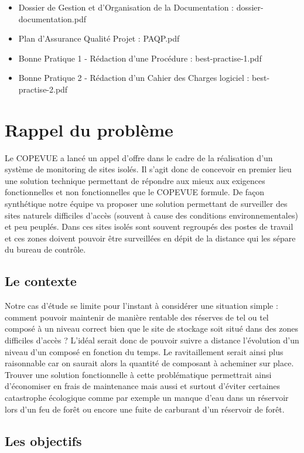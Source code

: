 \begin{itemize}
\item Dossier de Gestion et d'Organisation de la Documentation : dossier-documentation.pdf
\item Plan d'Assurance Qualité Projet : PAQP.pdf
\item Bonne Pratique 1 - Rédaction d'une Procédure : best-practise-1.pdf
\item Bonne Pratique 2 - Rédaction d'un Cahier des Charges logiciel : best-practise-2.pdf
\end{itemize}
    
\section{Rappel du problème}

Le COPEVUE a lancé un appel d'offre dans le cadre de la réalisation d'un système de monitoring de sites isolés. Il s'agit donc de concevoir en premier lieu une solution technique permettant de répondre aux mieux aux exigences fonctionnelles et non fonctionnelles que le COPEVUE formule. De façon synthétique notre équipe va proposer une solution permettant de surveiller des sites naturels difficiles d'accès (souvent à cause des conditions environnementales) et peu peuplés. Dans ces sites isolés sont souvent regroupés des postes de travail et ces zones doivent pouvoir être surveillées en dépit de la distance qui les sépare du bureau de contrôle.

\subsection{Le contexte}

Notre cas d'étude se limite pour l'instant à considérer une situation simple : comment pouvoir maintenir de manière rentable des réserves de tel ou tel composé à un niveau correct bien que le site de stockage soit situé dans des zones difficiles d'accès ? L'idéal serait donc de pouvoir suivre a distance l'évolution d'un niveau d'un composé en fonction du temps. Le ravitaillement serait ainsi plus raisonnable car on saurait alors la quantité de composant à acheminer sur place. Trouver une solution fonctionnelle à cette problématique permettrait ainsi d'économiser en frais de maintenance mais aussi et surtout d'éviter certaines catastrophe écologique comme par exemple un manque d'eau dans un réservoir lors d'un feu de forêt ou encore une fuite de carburant d'un réservoir de forêt.

\subsection{Les objectifs}

